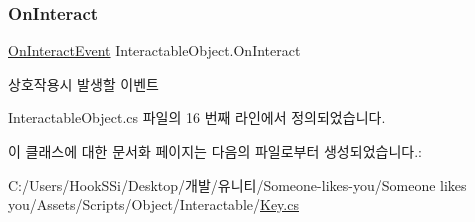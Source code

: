 \subsubsection{\texorpdfstring{OnInteract}{OnInteract}}
{\footnotesize\ttfamily \mbox{\hyperlink{class_interactable_object_a70a579e4b09d53e6cb77b5222189d5eb}{On\+Interact\+Event}} Interactable\+Object.\+On\+Interact\hspace{0.3cm}{\ttfamily [inherited]}}



상호작용시 발생할 이벤트 



Interactable\+Object.\+cs 파일의 16 번째 라인에서 정의되었습니다.



이 클래스에 대한 문서화 페이지는 다음의 파일로부터 생성되었습니다.\+:\begin{DoxyCompactItemize}
\item 
C\+:/\+Users/\+Hook\+S\+Si/\+Desktop/개발/유니티/\+Someone-\/likes-\/you/\+Someone likes you/\+Assets/\+Scripts/\+Object/\+Interactable/\mbox{\hyperlink{_key_8cs}{Key.\+cs}}\end{DoxyCompactItemize}
